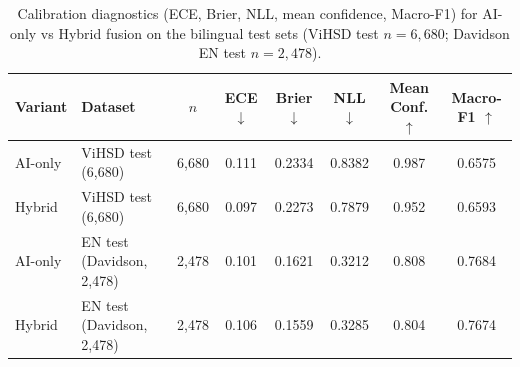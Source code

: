 \begin{table}[H]
    \centering
    \caption{Calibration diagnostics (ECE, Brier, NLL, mean confidence, Macro-F1) for AI-only vs Hybrid fusion on the bilingual test sets (ViHSD test $n{=}6{,}680$; Davidson EN test $n{=}2{,}478$).}
    \label{tab:hybrid-calibration}
    \begin{tabular}{llcccccc}
        \toprule
        Variant & Dataset                   & $n$   & ECE $\downarrow$ & Brier $\downarrow$ & NLL $\downarrow$ & Mean Conf. $\uparrow$ & Macro-F1 $\uparrow$ \\
        \midrule
        AI-only & ViHSD test (6,680)        & 6,680 & 0.111            & 0.2334             & 0.8382           & 0.987                 & 0.6575              \\
        Hybrid  & ViHSD test (6,680)        & 6,680 & 0.097            & 0.2273             & 0.7879           & 0.952                 & 0.6593              \\
        AI-only & EN test (Davidson, 2,478) & 2,478 & 0.101            & 0.1621             & 0.3212           & 0.808                 & 0.7684              \\
        Hybrid  & EN test (Davidson, 2,478) & 2,478 & 0.106            & 0.1559             & 0.3285           & 0.804                 & 0.7674              \\
        \bottomrule
    \end{tabular}
\end{table}
